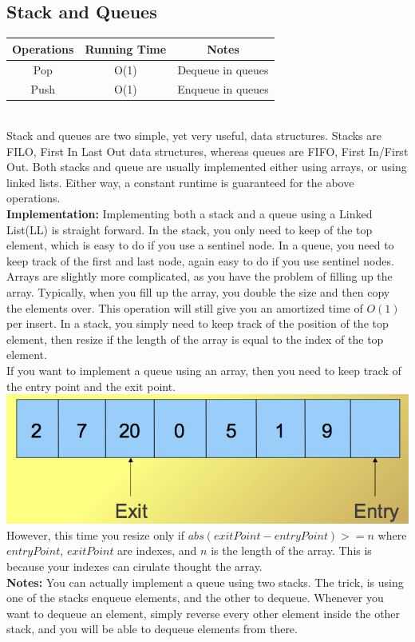 \documentclass[a4paper]{article}
\begin{document}
\subsection{Stack and Queues} %
\label{sub:Stack and Queues}
\begin{tabular}{ | c | c | c |}
  \hline
  {\bf Operations } & {\bf Running Time} & {\bf Notes}  \\
  \hline
  Pop & O(1) & Dequeue in queues \\
  \hline
  Push & O(1) & Enqueue in queues \\
  \hline
\end{tabular} \\
Stack and queues are two simple, yet very useful, data structures. Stacks are FILO, First In Last Out data structures, whereas queues are FIFO, First In/First Out. Both stacks and queue are usually implemented either using arrays, or using linked lists. Either way, a constant runtime is guaranteed for the above operations.\\
{\bf Implementation:} Implementing both a stack and a queue using a Linked List(LL) is straight forward. In the stack, you only need to keep of the top element, which is easy to do if you use a sentinel node. In a queue, you need to keep track of the first and last node, again easy to do if you use sentinel nodes.\\
Arrays are slightly more complicated, as you have the problem of filling up the array. Typically, when you fill up the array, you double the size and then copy the elements over. This operation will still give you an amortized time of $O(1)$ per insert. In a stack, you simply need to keep track of the position of the top element, then resize if the length of the array is equal to the index of the top element. \\ 
If you want to implement a queue using an array, then you need to keep track of the entry point and the exit point.\\
\includegraphics[scale=.40]{queueArray.png}\\
However, this time you resize only if $abs( exitPoint - entryPoint ) >= n$ where $entryPoint$, $exitPoint$ are indexes, and $n$ is the length of the array. This is because your indexes can cirulate thought the array.\\
{\bf Notes:} You can actually implement a queue using two stacks. The trick, is using one of the stacks enqueue elements, and the other to dequeue. Whenever you want to dequeue an element, simply reverse every other element inside the other stack, and you will be able to dequeue elements from there. 
\end{document}

